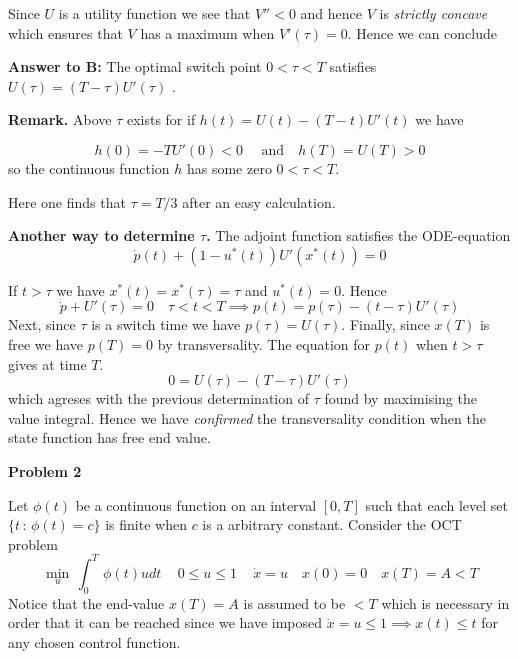 \documentclass{amsart}
\begin{document}
\noindent 
Since $U$ is a utility function we see that $V''<0$ and hence $V$ is 
\emph{strictly concave} 
which  ensures that $V$ has a maximum when
$V'(\tau)=0$.
Hence we can conclude
\medskip

\noindent
{\bf Answer to B:} The optimal switch point
$0<\tau<T$ satisfies
$U(\tau)=(T-\tau)U'(\tau)$ .
\medskip

\noindent
{\bf Remark.} Above $\tau$ exists for if 
$h(t)=U(t)-(T-t)U'(t)$ we have 

\[
h(0)=-TU'(0)<0\quad\text{ and}\quad  h(T)= U(T)>0
\]
so the continuous function $h$ has some zero $0<\tau<T$.

\medskip


 Here one finds that 
$\tau=T/3$ after an easy calculation. 
\medskip  

\noindent
{\bf Another way to determine $\tau$.}  The adjoint function satisfies  the
ODE-equation
\[ 
\dot p(t)+(1-u^*(t))U'(x^*(t))=0
\]

\noindent
If $t>\tau$ we have $x^*(t)=x^*(\tau)=\tau$ and $u^*(t)=0$. Hence
\[
\dot p+U'(\tau)=0\quad \tau<t<T\implies
p(t)=p(\tau)-(t-\tau)U'(\tau)
\]
Next, since $\tau$ is a switch time we have $p(\tau)=U(\tau)$. Finally, since
$x(T)$ is free we have $p(T)=0$ by transversality. The equation for 
$p(t)$ when $t>\tau$ gives at time $T$.
\[
0=U(\tau)-(T-\tau)U'(\tau)
\]
which agreses with the previous determination of $\tau$ found by maximising the value integral. 
Hence  we have  \emph{confirmed} the 
transversality condition when the state function has free end value.








\bigskip




\centerline {\bf   Problem 2}
\bigskip


\noindent
Let $\phi(t)$ be a continuous function on an interval $[0,T] $ such that
each level set $\{t\,\colon\, \phi(t)=c\}$
is finite when $c$ is a arbitrary constant.
Consider the OCT problem
\begin{equation*}
\min_u\,\int_0^T\, \phi(t)udt\quad\, 0\leq u\leq 1\quad\,\dot x=u\quad x(0)=0\quad x(T)=A<T
\end{equation*}
\medskip
\noindent 
Notice that the end-value $x(T)=A$ is assumed to be 
$<T$ which is necessary in order that it can be reached since we have imposed
$\dot x=u\leq 1\implies x(t)\leq t$ for any chosen control function.
\medskip
\end{document}
